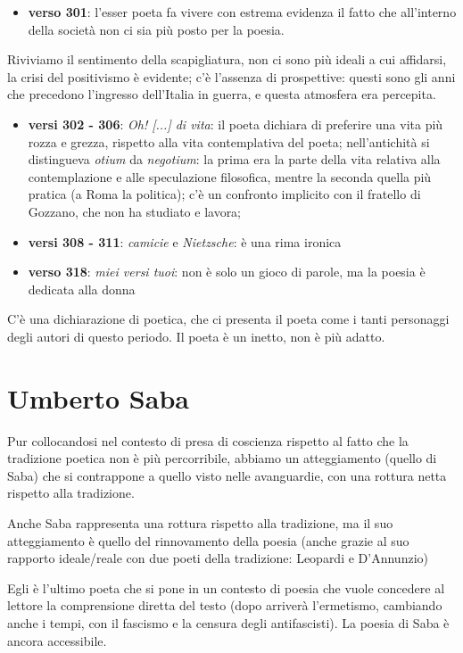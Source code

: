 \documentclass[a4paper, twoside, titlepage]{book}
\newcommand{\elenco}[1]{%
\begin{itemize}
#1
\end{itemize}}
\begin{document}
\elenco{
	\item \textbf{verso 301}: l’esser poeta fa vivere con estrema evidenza il fatto che all’interno della società non ci sia più posto per la poesia.}

Riviviamo il sentimento della scapigliatura, non ci sono più ideali a cui affidarsi, la crisi del positivismo è evidente; c’è l’assenza di prospettive: questi sono gli anni che precedono l’ingresso dell’Italia in guerra, e questa atmosfera era percepita.

\elenco{
	\item \textbf{versi 302 - 306}: \textit{Oh! [...] di vita}: il poeta dichiara di preferire una vita più rozza e grezza, rispetto alla vita contemplativa del poeta; nell’antichità si distingueva \textit{otium} da \textit{negotium}: la prima era la parte della vita relativa alla contemplazione e alle speculazione filosofica, mentre la seconda quella più pratica (a Roma la politica); c’è un confronto implicito con il fratello di Gozzano, che non ha studiato e lavora;
	\item \textbf{versi 308 - 311}: \textit{camicie} e \textit{Nietzsche}: è una rima ironica
	\item \textbf{verso 318}: \textit{miei versi tuoi}: non è solo un gioco di parole, ma la poesia è dedicata alla donna}

C’è una dichiarazione di poetica, che ci presenta il poeta come i tanti personaggi degli autori di questo periodo. Il poeta è un inetto, non è più adatto.

\chapter{Umberto Saba}

Pur collocandosi nel contesto di presa di coscienza rispetto al fatto che la tradizione poetica non è più percorribile, abbiamo un atteggiamento (quello di Saba) che si contrappone a quello visto nelle avanguardie, con una rottura netta rispetto alla tradizione.

Anche Saba rappresenta una rottura rispetto alla tradizione, ma il suo atteggiamento è quello del rinnovamento della poesia (anche grazie al suo rapporto ideale/reale con due poeti della tradizione: Leopardi e D’Annunzio)

Egli è l’ultimo poeta che si pone in un contesto di poesia che vuole concedere al lettore la comprensione diretta del testo (dopo arriverà l’ermetismo, cambiando anche i tempi, con il fascismo e la censura degli antifascisti). La poesia di Saba è ancora accessibile.
\end{document}
